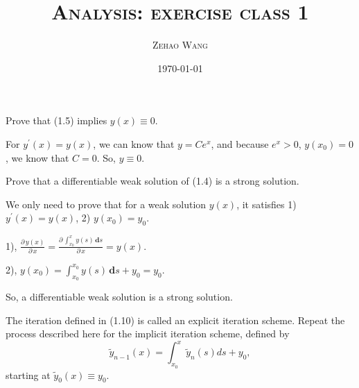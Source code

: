 \documentclass[en, normal, 12pt, black]{elegantnote}
\title{\textsc{Analysis: exercise class 1}}
\author{\textsc{Zehao Wang}}
\date{\today}
\newenvironment{exercise}[1]{\begin{tcolorbox}[colback=black!15, colframe=black!80, breakable, title=#1]}{\end{tcolorbox}}
\renewenvironment{proof}{\begin{tcolorbox}[colback=white, colframe=black!50, breakable, title=Proof. ]\setlength{\parskip}{0.8em}}{\,\\\rightline{$\square$}\end{tcolorbox}}
\newcommand{\pder}{\partial\,}
\newcommand{\der}{\,\mathbf{d}}
\begin{document}
\maketitle
    \begin{exercise}{1.1.}
        Prove that (1.5) implies \(y(x)\equiv0\).  
    \end{exercise}
    \begin{proof}
        For \(y^\prime(x)=y(x)\), we can know that \(y=Ce^x\), and because \(e^x>0\), \(y(x_0)=0\), we know that $C=0$. So, \(y\equiv 0\). 
    \end{proof}

    \begin{exercise}{1.4.}
        Prove that a differentiable weak solution of (1.4) is a strong solution. 
    \end{exercise}
    \begin{proof}
        We only need to prove that for a weak solution \(y(x)\), it satisfies 1) \(y^\prime(x)=y(x)\), 2) \(y(x_0)=y_0\). 

        1), \(\frac{\pder y(x)}{\pder x}=\frac{\pder \int_{x_0}^{x}y(s)\der s}{\pder x}=y(x)\). 

        2), \(y(x_0)=\int_{x_0}^{x_0}y(s)\der s+y_0=y_0\). 

        So, a differentiable weak solution is a strong solution. 
    \end{proof}

    \begin{exercise}{1.5.}
        The iteration defined in (1.10) is called an explicit iteration scheme. Repeat the process described here for the implicit iteration scheme, defined by
        \[\widetilde{y}_{n-1}(x)=\int_{x_{0}}^{x} \widetilde{y}_{n}(s) d s+y_{0}, \]
        starting at $\widetilde{y}_0(x)\equiv {y}_0$. 
    \end{exercise}
\end{document}
